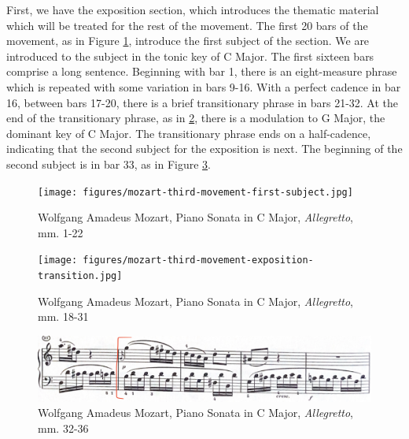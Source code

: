 First, we have the exposition section, which introduces the thematic material which will be treated for the rest of the movement. The first 20 bars of the movement, as in Figure \ref{fig:mozart-third-movement-first-subject}\autocite{Henle_1977}, introduce the first subject of the section. We are introduced to the subject in the tonic key of C Major. The first sixteen bars comprise a long sentence. Beginning with bar 1, there is an eight-measure phrase which is repeated with some variation in bars 9-16. With a perfect cadence in bar 16, between bars 17-20, there is a brief transitionary phrase in bars 21-32. At the end of the transitionary phrase, as in \ref{fig:mozart-third-movement-exposition-transition}\autocite{Henle_1977}, there is a modulation to G Major, the dominant key of C Major. The transitionary phrase ends on a half-cadence, indicating that the second subject for the exposition is next. The beginning of the second subject is in bar 33, as in Figure \ref{fig:mozart-third-movement-beginning-of-second-subject-exposition}\autocite{Henle_1977}. 

\begin{figure}[h]
	\centering
	\texttt{[image: figures/mozart-third-movement-first-subject.jpg]}
	\caption{Wolfgang Amadeus Mozart, Piano Sonata in C Major, \textit{Allegretto}, mm. 1-22}
	\label{fig:mozart-third-movement-first-subject}
\end{figure}

\begin{figure}[h]
  	\centering
  	\texttt{[image: figures/mozart-third-movement-exposition-transition.jpg]}
  	\caption{Wolfgang Amadeus Mozart, Piano Sonata in C Major, \textit{Allegretto}, mm. 18-31}
  	\label{fig:mozart-third-movement-exposition-transition}
\end{figure}

\begin{figure}[h]
	\centering
	\includegraphics[width=\textwidth]{figures/mozart-third-movement-beginning-of-second-subject-exposition.jpg}
	\caption{Wolfgang Amadeus Mozart, Piano Sonata in C Major, \textit{Allegretto}, mm. 32-36}
	\label{fig:mozart-third-movement-beginning-of-second-subject-exposition}
\end{figure}


